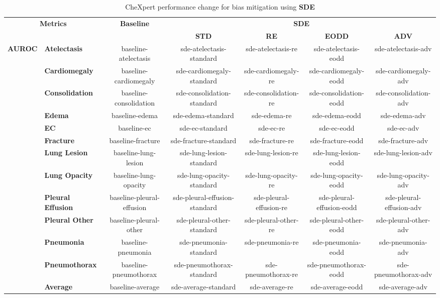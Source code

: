 \begin{table}[]
    \centering
    \caption{CheXpert performance change for bias mitigation using \textbf{SDE}}
    \label{tab:chex_perf_sde}
    \begin{tabular}{ll|c|cccc}
    \hline
    \multicolumn{2}{c|}{\multirow{2}{*}{\textbf{Metrics}}} 
    & \multirow{2}{*}{\textbf{Baseline}} 
    & \multicolumn{4}{c}{\textbf{SDE}} \\
    \cline{4-7}
     &  &  & \textbf{STD} & \textbf{RE} & \textbf{EODD} & \textbf{ADV} \\
    \hline

    \multirow{13}{*}{\textbf{AUROC}} 
    & \textbf{Atelectasis} & baseline-atelectasis & sde-atelectasis-standard & sde-atelectasis-re & sde-atelectasis-eodd & sde-atelectasis-adv \\
    & \textbf{Cardiomegaly} & baseline-cardiomegaly & sde-cardiomegaly-standard & sde-cardiomegaly-re & sde-cardiomegaly-eodd & sde-cardiomegaly-adv \\
    & \textbf{Consolidation} & baseline-consolidation & sde-consolidation-standard & sde-consolidation-re & sde-consolidation-eodd & sde-consolidation-adv \\
    & \textbf{Edema} & baseline-edema & sde-edema-standard & sde-edema-re & sde-edema-eodd & sde-edema-adv \\
    & \textbf{EC} & baseline-ec & sde-ec-standard & sde-ec-re & sde-ec-eodd & sde-ec-adv \\
    & \textbf{Fracture} & baseline-fracture & sde-fracture-standard & sde-fracture-re & sde-fracture-eodd & sde-fracture-adv \\
    & \textbf{Lung Lesion} & baseline-lung-lesion & sde-lung-lesion-standard & sde-lung-lesion-re & sde-lung-lesion-eodd & sde-lung-lesion-adv \\
    & \textbf{Lung Opacity} & baseline-lung-opacity & sde-lung-opacity-standard & sde-lung-opacity-re & sde-lung-opacity-eodd & sde-lung-opacity-adv \\
    & \textbf{Pleural Effusion} & baseline-pleural-effusion & sde-pleural-effusion-standard & sde-pleural-effusion-re & sde-pleural-effusion-eodd & sde-pleural-effusion-adv \\
    & \textbf{Pleural Other} & baseline-pleural-other & sde-pleural-other-standard & sde-pleural-other-re & sde-pleural-other-eodd & sde-pleural-other-adv \\
    & \textbf{Pneumonia} & baseline-pneumonia & sde-pneumonia-standard & sde-pneumonia-re & sde-pneumonia-eodd & sde-pneumonia-adv \\
    & \textbf{Pneumothorax} & baseline-pneumothorax & sde-pneumothorax-standard & sde-pneumothorax-re & sde-pneumothorax-eodd & sde-pneumothorax-adv \\
    & \textbf{Average} & baseline-average & sde-average-standard & sde-average-re & sde-average-eodd & sde-average-adv \\
    \cline{1-2}
    

\end{tabular}
\end{table}

